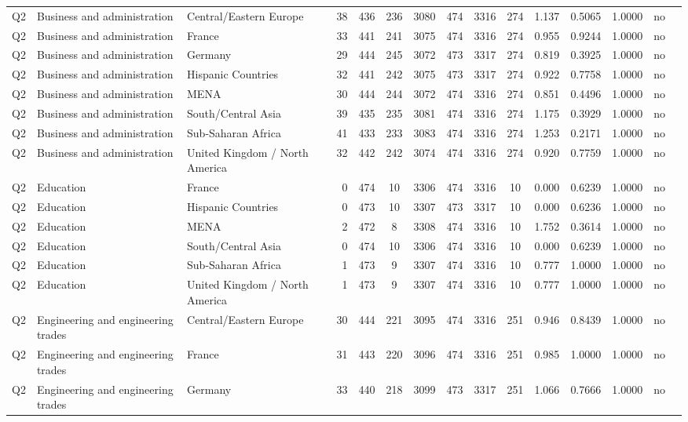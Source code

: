 \begin{longtable}{lllrcccccccccll}
Q2 & Business and administration & Central/Eastern Europe & 38 & 436 & 236 & 3080 & 474 & 3316 & 274 & 1.137 & 0.5065 & 1.0000 & no \\
Q2 & Business and administration & France & 33 & 441 & 241 & 3075 & 474 & 3316 & 274 & 0.955 & 0.9244 & 1.0000 & no \\
Q2 & Business and administration & Germany & 29 & 444 & 245 & 3072 & 473 & 3317 & 274 & 0.819 & 0.3925 & 1.0000 & no \\
Q2 & Business and administration & Hispanic Countries & 32 & 441 & 242 & 3075 & 473 & 3317 & 274 & 0.922 & 0.7758 & 1.0000 & no \\
Q2 & Business and administration & MENA & 30 & 444 & 244 & 3072 & 474 & 3316 & 274 & 0.851 & 0.4496 & 1.0000 & no \\
Q2 & Business and administration & South/Central Asia & 39 & 435 & 235 & 3081 & 474 & 3316 & 274 & 1.175 & 0.3929 & 1.0000 & no \\
Q2 & Business and administration & Sub-Saharan Africa & 41 & 433 & 233 & 3083 & 474 & 3316 & 274 & 1.253 & 0.2171 & 1.0000 & no \\
Q2 & Business and administration & United Kingdom / North America & 32 & 442 & 242 & 3074 & 474 & 3316 & 274 & 0.920 & 0.7759 & 1.0000 & no \\
Q2 & Education & France & 0 & 474 & 10 & 3306 & 474 & 3316 & 10 & 0.000 & 0.6239 & 1.0000 & no \\
Q2 & Education & Hispanic Countries & 0 & 473 & 10 & 3307 & 473 & 3317 & 10 & 0.000 & 0.6236 & 1.0000 & no \\
Q2 & Education & MENA & 2 & 472 & 8 & 3308 & 474 & 3316 & 10 & 1.752 & 0.3614 & 1.0000 & no \\
Q2 & Education & South/Central Asia & 0 & 474 & 10 & 3306 & 474 & 3316 & 10 & 0.000 & 0.6239 & 1.0000 & no \\
Q2 & Education & Sub-Saharan Africa & 1 & 473 & 9 & 3307 & 474 & 3316 & 10 & 0.777 & 1.0000 & 1.0000 & no \\
Q2 & Education & United Kingdom / North America & 1 & 473 & 9 & 3307 & 474 & 3316 & 10 & 0.777 & 1.0000 & 1.0000 & no \\
Q2 & Engineering and engineering trades & Central/Eastern Europe & 30 & 444 & 221 & 3095 & 474 & 3316 & 251 & 0.946 & 0.8439 & 1.0000 & no \\
Q2 & Engineering and engineering trades & France & 31 & 443 & 220 & 3096 & 474 & 3316 & 251 & 0.985 & 1.0000 & 1.0000 & no \\
Q2 & Engineering and engineering trades & Germany & 33 & 440 & 218 & 3099 & 473 & 3317 & 251 & 1.066 & 0.7666 & 1.0000 & no \\

\end{longtable}
